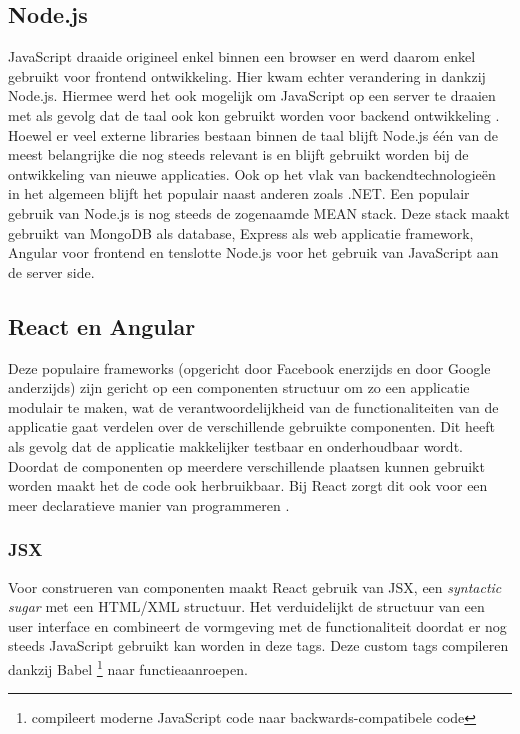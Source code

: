 \subsection{Node.js}
JavaScript draaide origineel enkel binnen een browser en werd daarom enkel gebruikt voor frontend ontwikkeling. Hier kwam echter verandering in dankzij Node.js. Hiermee werd het ook mogelijk om JavaScript op een server te draaien met als gevolg dat de taal ook kon gebruikt worden voor backend ontwikkeling \autocite{Brown2014}. Hoewel er veel externe libraries bestaan binnen de taal blijft Node.js één van de meest belangrijke die nog steeds relevant is en blijft gebruikt worden bij de ontwikkeling van nieuwe applicaties. Ook op het vlak van backendtechnologieën in het algemeen blijft het populair naast anderen zoals .NET. Een populair gebruik van Node.js is nog steeds de zogenaamde MEAN stack. Deze stack maakt gebruikt van MongoDB als database, Express als web applicatie framework, Angular voor frontend en tenslotte Node.js voor het gebruik van JavaScript aan de server side.

\subsection{React en Angular}
Deze populaire frameworks (opgericht door Facebook enerzijds en door Google anderzijds) zijn gericht op een componenten structuur om zo een applicatie modulair te maken, wat de verantwoordelijkheid van de functionaliteiten van de applicatie gaat verdelen over de verschillende gebruikte componenten. Dit heeft als gevolg dat de applicatie makkelijker testbaar en onderhoudbaar wordt. Doordat de componenten op meerdere verschillende plaatsen kunnen gebruikt worden maakt het de code ook herbruikbaar. Bij React zorgt dit ook voor een meer declaratieve manier van programmeren \autocite{Bertoli2017}.

\subsubsection{JSX}
Voor construeren van componenten maakt React gebruik van JSX, een \textit{syntactic sugar} met een HTML/XML structuur. Het verduidelijkt de structuur van een user interface en combineert de vormgeving met de functionaliteit doordat er nog steeds JavaScript gebruikt kan worden in deze tags. Deze custom tags compileren dankzij Babel \footnote{compileert moderne JavaScript code naar backwards-compatibele code} \autocite{Babel2019} naar functieaanroepen.

